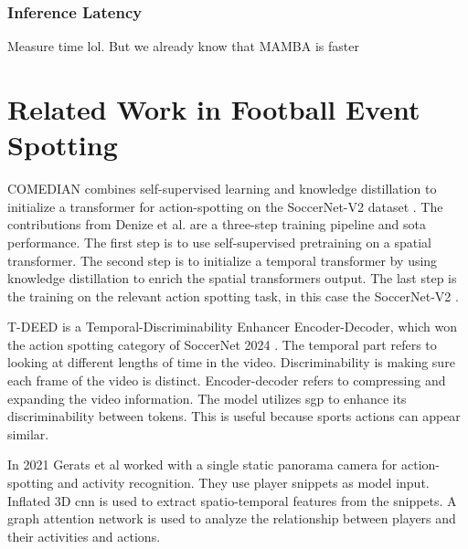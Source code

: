\subsubsection{Inference Latency} 
Measure time lol. But we already know that MAMBA is faster 

\section{Related Work in Football Event Spotting}
\label{sec:fw_work}

COMEDIAN \cite{denize_comedian_2024} combines self-supervised learning and knowledge distillation to initialize a transformer for action-spotting on the SoccerNet-V2 dataset \cite{deliege_soccernet-v2_dataset_2021}. The contributions from Denize et al. are a three-step training pipeline and \acrshort{sota} performance. The first step is to use self-supervised pretraining on a spatial transformer. The second step is to initialize a temporal transformer by using knowledge distillation to enrich the spatial transformers output. The last step is the training on the relevant action spotting task, in this case the SoccerNet-V2 \cite{deliege_soccernet-v2_dataset_2021}.

T-DEED \cite{xarles_t-deed_2024} is a Temporal-Discriminability Enhancer Encoder-Decoder, which won the action spotting category of SoccerNet 2024 \cite{cioppa_soccernet_2024}. The temporal part refers to looking at different lengths of time in the video. Discriminability is making sure each frame of the video is distinct. Encoder-decoder refers to compressing and expanding the video information. The model utilizes \acrfull{sgp} to enhance its discriminability between tokens. This is useful because sports actions can appear similar. 

In 2021 Gerats et al\cite{gerats_individual_same_task_2021} worked with a single static panorama camera for action-spotting and activity recognition. They use player snippets as model input. Inflated 3D \acrshort{cnn} is used to extract spatio-temporal features from the snippets. A graph attention network is used to analyze the relationship between players and their activities and actions. 


